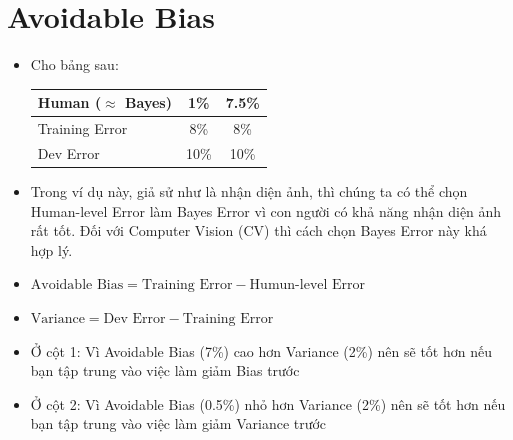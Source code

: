 \documentclass[12pt,a4paper]{report}
\begin{document}
	\section{Avoidable Bias}
		\begin{itemize}
			\item Cho bảng sau:\\
				\begin{tabular}{l|c|c}
				Human ($\approx$ Bayes)&1\%&7.5\%\\
				\hline
				Training Error&8\%&8\%\\
				Dev Error&10\%&10\%\\				
				\end{tabular}
			\item Trong ví dụ này, giả sử như là nhận diện ảnh, thì chúng ta có thể chọn Human-level Error làm Bayes Error vì con người có khả năng nhận diện ảnh rất tốt. Đối với Computer Vision (CV) thì cách chọn Bayes Error này khá hợp lý.
			\item $\text{Avoidable Bias} = \text{Training Error} - \text{Humun-level Error}$
			\item $\text{Variance} = \text{Dev Error} - \text{Training Error}$
			\item Ở cột 1: Vì Avoidable Bias (7\%) cao hơn Variance (2\%) nên sẽ tốt hơn nếu bạn tập trung vào việc làm giảm Bias trước
			\item Ở cột 2: Vì Avoidable Bias (0.5\%) nhỏ hơn Variance (2\%) nên sẽ tốt hơn nếu bạn tập trung vào việc làm giảm Variance trước
		\end{itemize}
\end{document}
